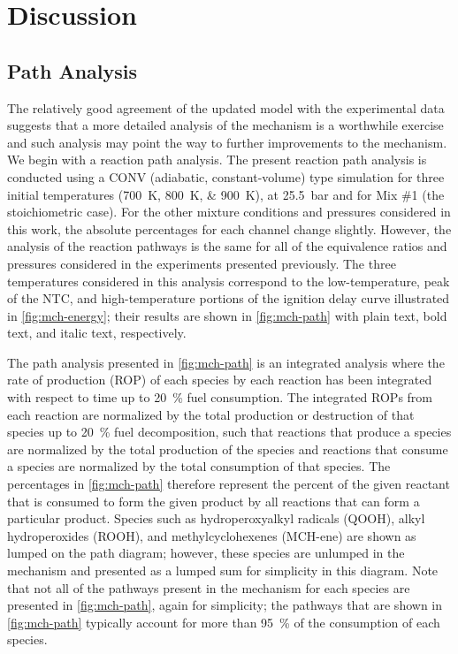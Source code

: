 \documentclass[../main.tex]{subfiles}
\begin{document}
\section{Discussion}
\label{sec:discussion}
\subsection{Path Analysis}
\label{sec:mch-path-analysis}

The relatively good agreement of the updated model with the experimental data
suggests that a more detailed analysis of the mechanism is a worthwhile
exercise and such analysis may point the way to further improvements to the
mechanism. We begin with a reaction path analysis. The present reaction path
analysis is conducted using a CONV (adiabatic, constant-volume) type simulation
for three initial temperatures (\SIlist{700;800;900}{\kelvin}), at \SI{25.5}{\bar} and for
Mix \#1 (the stoichiometric case). For the other mixture conditions and
pressures considered in this work, the absolute percentages for each channel
change slightly. However, the analysis of the reaction pathways is the same for
all of the equivalence ratios and pressures considered in the experiments
presented previously. The three temperatures considered in this analysis
correspond to the low-temperature, peak of the NTC, and high-temperature
portions of the ignition delay curve illustrated in \cref{fig:mch-energy};
their results are shown in \cref{fig:mch-path} with plain text, bold text,
and italic text, respectively.

The path analysis presented in \cref{fig:mch-path} is an integrated analysis
where the rate of production (ROP) of each species by each reaction has been
integrated with respect to time up to \SI{20}{\percent} fuel consumption. The integrated
ROPs from each reaction are normalized by the total production or destruction
of that species up to \SI{20}{\percent} fuel decomposition, such that reactions that produce
a species are normalized by the total production of the species and reactions
that consume a species are normalized by the total consumption of that species.
The percentages in \cref{fig:mch-path} therefore represent the percent of the given
reactant that is consumed to form the given product by all reactions that can
form a particular product. Species such as hydroperoxyalkyl radicals (QOOH),
alkyl hydroperoxides (ROOH), and methylcyclohexenes (MCH-ene) are shown as
lumped on the path diagram; however, these species are unlumped in the
mechanism and presented as a lumped sum for simplicity in this diagram. Note
that not all of the pathways present in the mechanism for each species are
presented in \cref{fig:mch-path}, again for simplicity; the pathways that are shown in
\cref{fig:mch-path} typically account for more than \SI{95}{\percent} of the consumption
of each species.
\end{document}
